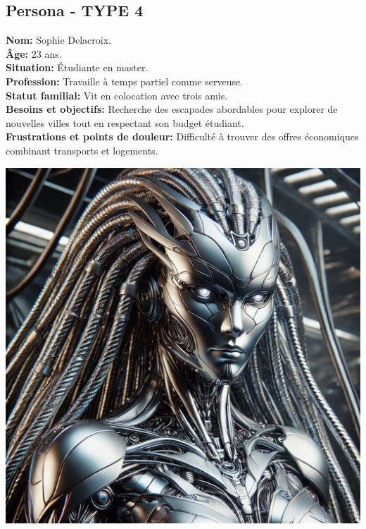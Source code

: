 \documentclass[a4paper,11pt]{article}
\begin{document}
\subsection{Persona - TYPE 4}
\begin{minipage}{0.6\textwidth} %
\textbf{Nom:} Sophie Delacroix.\\
\textbf{Âge:} 23 ans.\\
\textbf{Situation:} Étudiante en master.\\
\textbf{Profession:} Travaille à temps partiel comme serveuse.\\
\textbf{Statut familial:} Vit en colocation avec trois amis.\\
\textbf{Besoins et objectifs:} Recherche des escapades abordables pour explorer de nouvelles villes tout en respectant son budget étudiant.\\
\textbf{Frustrations et points de douleur:} Difficulté à trouver des offres économiques combinant transports et logements.\\
\end{minipage}%
\hspace{1cm}
\begin{minipage}{0.3\textwidth} %
    \begin{center}
        \includegraphics[width=\textwidth]{images/autobott.jpeg} %
    \end{center}
\end{minipage}
\end{document}
